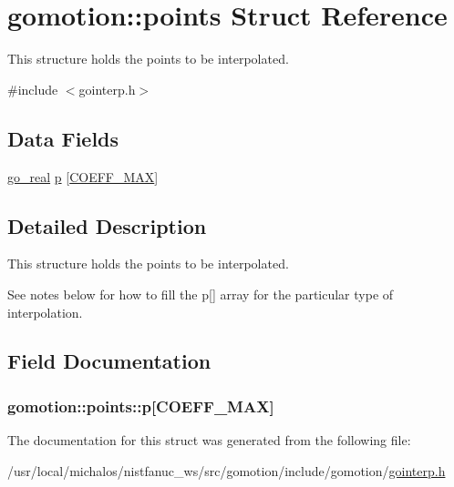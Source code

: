 \hypertarget{structgomotion_1_1points}{\section{gomotion\-:\-:points Struct Reference}
\label{structgomotion_1_1points}
}


This structure holds the points to be interpolated.  




{\ttfamily \#include $<$gointerp.\-h$>$}

\subsection*{Data Fields}
\begin{DoxyCompactItemize}
\item 
\hyperlink{gotypes_8h_afd666a2393eebd71ee455846ac9def9b}{go\-\_\-real} \hyperlink{structgomotion_1_1points_a32050509c895b3df0be8f0968d61e5cf}{p} \mbox{[}\hyperlink{namespacegomotion_ada59e79a297fc10f2dbc85e4777fa4aea0d345844cda261ed2253d7fc9404e2ef}{C\-O\-E\-F\-F\-\_\-\-M\-A\-X}\mbox{]}
\end{DoxyCompactItemize}


\subsection{Detailed Description}
This structure holds the points to be interpolated. 

See notes below for how to fill the p\mbox{[}\mbox{]} array for the particular type of interpolation. 

\subsection{Field Documentation}
\hypertarget{structgomotion_1_1points_a32050509c895b3df0be8f0968d61e5cf}{
\subsubsection[{p}]{ gomotion\-::points\-::p\mbox{[}{\bf C\-O\-E\-F\-F\-\_\-\-M\-A\-X}\mbox{]}}}\label{structgomotion_1_1points_a32050509c895b3df0be8f0968d61e5cf}


The documentation for this struct was generated from the following file\-:\begin{DoxyCompactItemize}
\item 
/usr/local/michalos/nistfanuc\-\_\-ws/src/gomotion/include/gomotion/\hyperlink{gointerp_8h}{gointerp.\-h}\end{DoxyCompactItemize}
